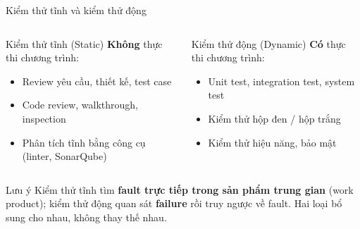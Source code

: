 \documentclass[aspectratio=169,12pt]{beamer}
\begin{document}
\begin{frame}{Kiểm thử tĩnh và kiểm thử động}
  \begin{columns}
    \begin{block}{Kiểm thử tĩnh (Static)}
      \textbf{Không} thực thi chương trình:
      \begin{itemize}
        \item Review yêu cầu, thiết kế, test case
        \item Code review, walkthrough, inspection
        \item Phân tích tĩnh bằng công cụ (linter, SonarQube)
      \end{itemize}
    \end{block}

    \begin{block}{Kiểm thử động (Dynamic)}
      \textbf{Có} thực thi chương trình:
      \begin{itemize}
        \item Unit test, integration test, system test
        \item Kiểm thử hộp đen / hộp trắng
        \item Kiểm thử hiệu năng, bảo mật
      \end{itemize}
    \end{block}
  \end{columns}

  \vspace{0.5em}
  \begin{alertblock}{Lưu ý}
    Kiểm thử tĩnh tìm \textbf{fault trực tiếp trong sản phẩm trung gian}
    (work product); kiểm thử động quan sát \textbf{failure} rồi truy ngược
    về fault. Hai loại bổ sung cho nhau, không thay thế nhau.
  \end{alertblock}
\end{frame}
\end{document}
